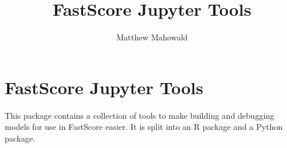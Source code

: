 \documentclass[]{odgdoc}
\title{FastScore Jupyter Tools}
\author{Matthew Mahowald}
\date{}
\begin{document}
\maketitle

{
\setcounter{tocdepth}{3}
\tableofcontents
}
\section{FastScore Jupyter Tools}\label{fastscore-jupyter-tools}

This package contains a collection of tools to make building and
debugging models for use in FastScore easier. It is split into an R
package and a Python package.
\end{document}
